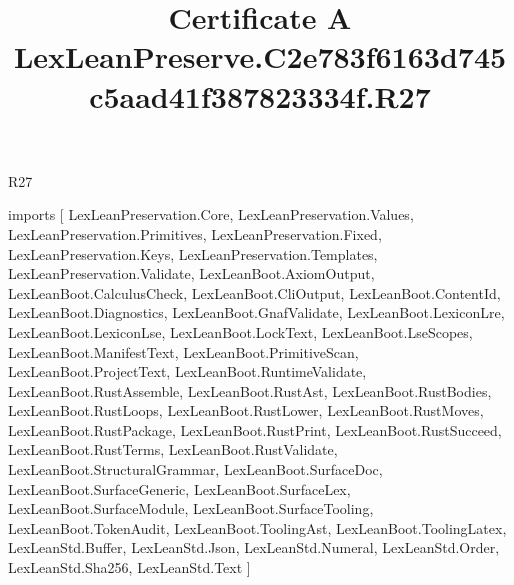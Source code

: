 \begin{lexlean}{R27}
\title{Certificate A LexLeanPreserve.C2e783f6163d745c5aad41f387823334f.R27}
\begin{coremodule}
imports [
  LexLeanPreservation.Core,
  LexLeanPreservation.Values,
  LexLeanPreservation.Primitives,
  LexLeanPreservation.Fixed,
  LexLeanPreservation.Keys,
  LexLeanPreservation.Templates,
  LexLeanPreservation.Validate,
  LexLeanBoot.AxiomOutput,
  LexLeanBoot.CalculusCheck,
  LexLeanBoot.CliOutput,
  LexLeanBoot.ContentId,
  LexLeanBoot.Diagnostics,
  LexLeanBoot.GnafValidate,
  LexLeanBoot.LexiconLre,
  LexLeanBoot.LexiconLse,
  LexLeanBoot.LockText,
  LexLeanBoot.LseScopes,
  LexLeanBoot.ManifestText,
  LexLeanBoot.PrimitiveScan,
  LexLeanBoot.ProjectText,
  LexLeanBoot.RuntimeValidate,
  LexLeanBoot.RustAssemble,
  LexLeanBoot.RustAst,
  LexLeanBoot.RustBodies,
  LexLeanBoot.RustLoops,
  LexLeanBoot.RustLower,
  LexLeanBoot.RustMoves,
  LexLeanBoot.RustPackage,
  LexLeanBoot.RustPrint,
  LexLeanBoot.RustSucceed,
  LexLeanBoot.RustTerms,
  LexLeanBoot.RustValidate,
  LexLeanBoot.StructuralGrammar,
  LexLeanBoot.SurfaceDoc,
  LexLeanBoot.SurfaceGeneric,
  LexLeanBoot.SurfaceLex,
  LexLeanBoot.SurfaceModule,
  LexLeanBoot.SurfaceTooling,
  LexLeanBoot.TokenAudit,
  LexLeanBoot.ToolingAst,
  LexLeanBoot.ToolingLatex,
  LexLeanStd.Buffer,
  LexLeanStd.Json,
  LexLeanStd.Numeral,
  LexLeanStd.Order,
  LexLeanStd.Sha256,
  LexLeanStd.Text
]


\end{coremodule}
\end{lexlean}
